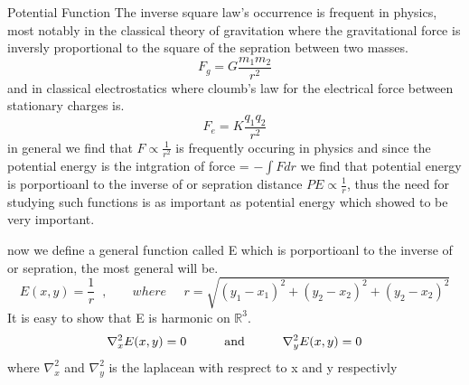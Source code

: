 \documentclass[]{article}
\begin{document}
\begin{enrichment*}{Potential Function}
    The inverse square law's occurrence is frequent in physics, most notably in the classical theory of gravitation where the gravitational force is inversly proportional to the square of the sepration between two masses.
\[
    F_g = G\frac{m_1 m_2}{r^2}    
\]
and in classical electrostatics where cloumb's law for the electrical force between stationary charges is.
\[
    F_e = K\frac{q_1 q_2}{r^2}    
\]
in general we find that $F \propto \frac{1}{r^2}$ is frequently occuring in physics and since the potential energy is the intgration of force
= $\displaystyle -\int F dr$ we find that potential energy is porportioanl to the inverse of or sepration distance $PE \propto \frac{1}{r}$, thus the need for studying such functions is as important as potential energy which showed to be very important.
\par
now we define a general function called E which is porportioanl to the inverse of or sepration, the most general will be.
\[
    E(x,y) = \frac{1}{r}\;\;,\;\;\;\;\;\;\; where\;\;\;\;\; r = \sqrt{(y_1-x_1)^2 + (y_2-x_2)^2 + (y_2-x_2)^2}    
\]
It is easy to show that E is harmonic on $\mathbb{R}^3$.
\[
    \nabla_{x}^{2} E(x,y) = 0 \quad\quad\quad \text{and} \quad\quad\quad \nabla_{y}^{2} E(x,y) = 0    
\]
where $\nabla_{x}^{2}$ and $\nabla_{y}^{2}$ is the laplacean with resprect to x and y respectivly
\end{enrichment*}

\setcounter{equation}{0}
\end{document}

